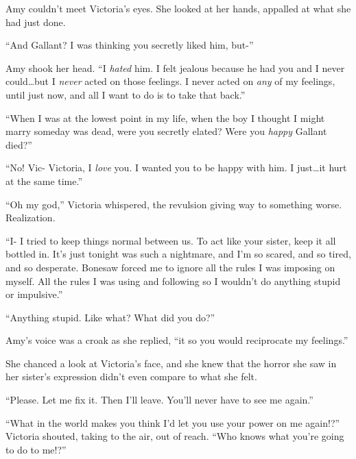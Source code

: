 Amy couldn't meet Victoria's eyes.  She looked at her hands, appalled at what she had just done.



``And Gallant?  I was thinking you secretly liked him, but-''



Amy shook her head.  ``I \emph{hated} him.  I felt jealous because he had you and I never could\ldots but I \emph{never} acted on those feelings.  I never acted on \emph{any} of my feelings, until just now, and all I want to do is to take that back.''



``When I was at the lowest point in my life, when the boy I thought I might marry someday was dead, were you secretly elated?  Were you \emph{happy} Gallant died?''



``No!  Vic- Victoria, I \emph{love} you.  I wanted you to be happy with him.  I just\ldots it hurt at the same time.''



``Oh my god,'' Victoria whispered, the revulsion giving way to something worse.  Realization.



``I- I tried to keep things normal between us.  To act like your sister, keep it all bottled in.  It's just tonight was such a nightmare, and I'm so scared, and so tired, and so desperate.  Bonesaw forced me to ignore all the rules I was imposing on myself.  All the rules I was using and following so I wouldn't do anything stupid or impulsive.''



``Anything stupid.  Like what?  What did you do?''



Amy's voice was a croak as she replied, ``\ldotsmake it so you would reciprocate my feelings.''



She chanced a look at Victoria's face, and she knew that the horror she saw in her sister's expression didn't even compare to what she felt.



``Please.  Let me fix it.  Then I'll leave.  You'll never have to see me again.''



``What in the world makes you think I'd let you use your power on me again!?''  Victoria shouted, taking to the air, out of reach.  ``Who knows what you're going to do to me!?''



